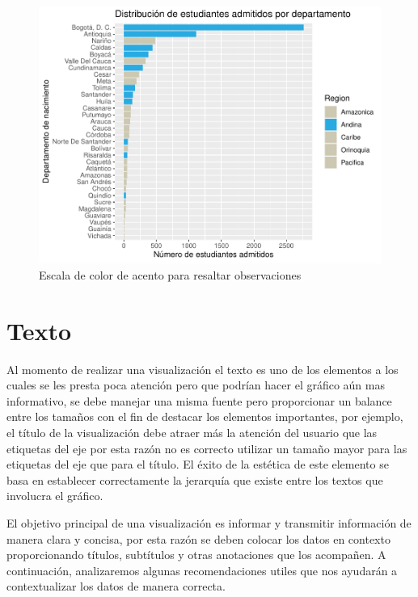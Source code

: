 \documentclass[
]{book}
\begin{document}
\begin{figure}

{\centering \includegraphics[width=0.8\linewidth]{Lineamientos-Visualizar_files/figure-latex/resaltardatos-fig-1} 

}

\caption{Escala de color de acento para resaltar observaciones}\label{fig:resaltardatos-fig}
\end{figure}

\hypertarget{texto}{%
\section{Texto}\label{texto}}

Al momento de realizar una visualización el texto es uno de los elementos a los cuales se les presta poca atención pero que podrían hacer el gráfico aún mas informativo, se debe manejar una misma fuente pero proporcionar un balance entre los tamaños con el fin de destacar los elementos importantes, por ejemplo, el título de la visualización debe atraer más la atención del usuario que las etiquetas del eje por esta razón no es correcto utilizar un tamaño mayor para las etiquetas del eje que para el título. El éxito de la estética de este elemento se basa en establecer correctamente la jerarquía que existe entre los textos que involucra el gráfico.

El objetivo principal de una visualización es informar y transmitir información de manera clara y concisa, por esta razón se deben colocar los datos en contexto proporcionando títulos, subtítulos y otras anotaciones que los acompañen. A continuación, analizaremos algunas recomendaciones utiles que nos ayudarán a contextualizar los datos de manera correcta.
\end{document}
